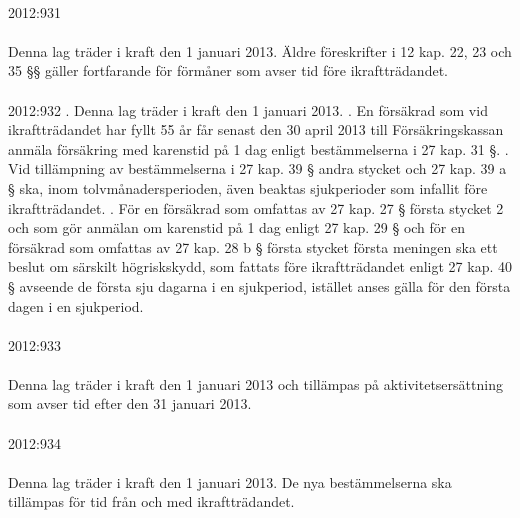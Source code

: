 \documentclass[a4paper,notitlepage,openany,10pt]{book}
\begin{document}
\paragraph*{}
2012:931
\paragraph*{}
Denna lag träder i kraft den 1 januari 2013. Äldre föreskrifter i 12 kap. 22, 23 och 35 §§ gäller fortfarande för förmåner som avser tid före ikraftträdandet.
\paragraph*{}
2012:932
. Denna lag träder i kraft den 1 januari 2013.
. En försäkrad som vid ikraftträdandet har fyllt 55 år får senast den 30 april 2013 till Försäkringskassan anmäla försäkring med karenstid på 1 dag enligt bestämmelserna i 27 kap. 31 §.
. Vid tillämpning av bestämmelserna i 27 kap. 39 § andra stycket och 27 kap. 39 a § ska, inom tolvmånadersperioden, även beaktas sjukperioder som infallit före ikraftträdandet.
. För en försäkrad som omfattas av 27 kap. 27 § första stycket 2 och som gör anmälan om karenstid på 1 dag enligt 27 kap. 29 § och för en försäkrad som omfattas av 27 kap. 28 b § första stycket första meningen ska ett beslut om särskilt högriskskydd, som fattats före ikraftträdandet enligt 27 kap. 40 § avseende de första sju dagarna i en sjukperiod, istället anses gälla för den första dagen i en sjukperiod.
\paragraph*{}
2012:933
\paragraph*{}
Denna lag träder i kraft den 1 januari 2013 och tillämpas på aktivitetsersättning som avser tid efter den 31 januari 2013.
\paragraph*{}
2012:934
\paragraph*{}
Denna lag träder i kraft den 1 januari 2013. De nya bestämmelserna ska tillämpas för tid från och med ikraftträdandet.
\end{document}
